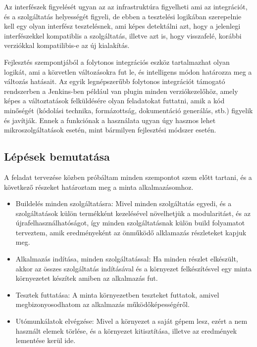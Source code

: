 \documentclass[11pt,magyar,a4paper,twoside,]{report}
\providecommand{\tightlist}{%
  \setlength{\itemsep}{0pt}\setlength{\parskip}{0pt}}
\begin{document}
Az interfészek figyelését ugyan az az infrastruktúra figyelheti ami az
integrációt, és a szolgáltatás helyességét figyeli, de ebben a
tesztelési logikában szerepelnie kell egy olyan interfész tesztelésnek,
ami képes detektálni azt, hogy a jelenlegi interfészekkel kompatiblis a
szolgáltatás, illetve azt is, hogy visszafelé, korábbi verziókkal
kompatilibis-e az új kialakítás.

Fejlesztés szempontjából a folytonos integrációs eszköz tartalmazhat
olyan logikát, ami a közvetlen változásokra fut le, és intelligens módon
határozza meg a változás hatásait. Az egyik legnépszerűbb folytonos
integrációt támogató rendszerben a Jenkins-ben például van plugin minden
verziókezelőhöz, amely képes a változtatások felküldésére olyan
feladatokat futtatni, amik a kód minőségét (kódolási technika,
formázottság, dokumentáció generálás, stb.) figyelik és javítják. Ennek
a funkciónak a használata ugyan úgy hasznos lehet mikroszolgáltatások
esetén, mint bármilyen fejlesztési módszer esetén.

\subsection{Lépések bemutatása}\label{luxe9puxe9sek-bemutatuxe1sa}

A feladat tervezése közben próbáltam minden szempontot szem előtt
tartani, és a következő részeket határoztam meg a minta alkalmazásomhoz.

\begin{itemize}
\tightlist
\item
  Buildelés minden szolgáltatásra: Mivel minden szolgáltatás egyedi, és
  a szolgáltatások külön termékként kezelésével növelhetjük a
  modularitást, és az újrafelhasználhatóságot, így minden
  szolgáltatásnak külön build folyamatot terveztem, amik eredményeként
  az önműködő alklamazás részleteket kapjuk meg.
\item
  Alkalmazás indítása, minden szolgáltatással: Ha minden részlet
  elkészült, akkor az összes szolgáltatás indításával és a környezet
  felkészítésvel egy minta környezetet készítek amiben az alkalmazás
  fut.
\item
  Tesztek futtatása: A minta környezetben teszteket futtatok, amivel
  megbizonyosodhatom az alkalmazás működőképességéről.
\item
  Utómunkálatok elvégzése: Mivel a környezet a saját gépem lesz, ezért a
  nem használt elemek törlése, és a környezet kitisztítása, illetve az
  eredmények lementése kerül ide.
\end{itemize}
\end{document}
